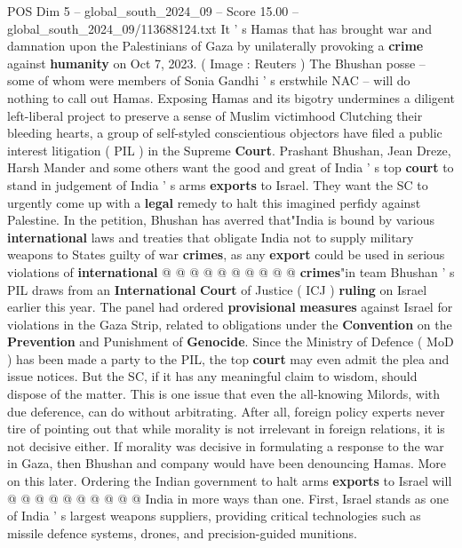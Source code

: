 \begin{textsample}{POS Dim 5 – global\_south\_2024\_09 – Score 15.00 – global\_south\_2024\_09/113688124.txt}  \label{ex:f5_pos_253}
It ' s Hamas that has brought war and damnation upon the Palestinians of Gaza by unilaterally provoking a \textbf{crime} against \textbf{humanity} on Oct 7, 2023. ( Image : Reuters ) The Bhushan posse -- some of whom were members of Sonia Gandhi ' s erstwhile NAC -- will do nothing to call out Hamas.
Exposing Hamas and its bigotry undermines a diligent left-liberal project to preserve a sense of Muslim victimhood Clutching their bleeding hearts, a group of self-styled conscientious objectors have filed a public interest litigation ( PIL ) in the Supreme \textbf{Court}.
Prashant Bhushan, Jean Dreze, Harsh Mander and some others want the good and great of India ' s top \textbf{court} to stand in judgement of India ' s arms \textbf{exports} to Israel.
They want the SC to urgently come up with a \textbf{legal} remedy to halt this imagined perfidy against Palestine.
In the petition, Bhushan has averred that"India is bound by various \textbf{international} laws and treaties that obligate India not to supply military weapons to States guilty of war \textbf{crimes}, as any \textbf{export} could be used in serious violations of \textbf{international} @ @ @ @ @ @ @ @ @ @ \textbf{crimes}"in team Bhushan ' s PIL draws from an \textbf{International} \textbf{Court} of Justice ( ICJ ) \textbf{ruling} on Israel earlier this year.
The panel had ordered \textbf{provisional} \textbf{measures} against Israel for violations in the Gaza Strip, related to obligations under the \textbf{Convention} on the \textbf{Prevention} and Punishment of \textbf{Genocide}.
Since the Ministry of Defence ( MoD ) has been made a party to the PIL, the top \textbf{court} may even admit the plea and issue notices.
But the SC, if it has any meaningful claim to wisdom, should dispose of the matter.
This is one issue that even the all-knowing Milords, with due deference, can do without arbitrating.
After all, foreign policy experts never tire of pointing out that while morality is not irrelevant in foreign relations, it is not decisive either.
If morality was decisive in formulating a response to the war in Gaza, then Bhushan and company would have been denouncing Hamas.
More on this later.
Ordering the Indian government to halt arms \textbf{exports} to Israel will @ @ @ @ @ @ @ @ @ @ India in more ways than one.
First, Israel stands as one of India ' s largest weapons suppliers, providing critical technologies such as missile defence systems, drones, and precision-guided munitions.

\end{textsample}
